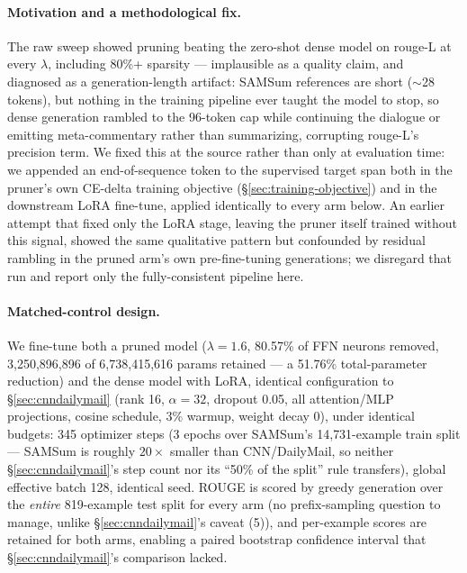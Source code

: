 \documentclass[11pt]{article}
\begin{document}
\paragraph{Motivation and a methodological fix.} The raw sweep showed
pruning beating the zero-shot dense model on rouge-L at every $\lambda$,
including 80\%+ sparsity --- implausible as a quality claim, and diagnosed as
a generation-length artifact: SAMSum references are short ($\sim$28 tokens),
but nothing in the training pipeline ever taught the model to stop, so
dense generation rambled to the 96-token cap while continuing the dialogue
or emitting meta-commentary rather than summarizing, corrupting rouge-L's
precision term. We fixed this at the source rather than only at
evaluation time: we appended an end-of-sequence token to the supervised
target span both in the pruner's own CE-delta training objective
(\S\ref{sec:training-objective}) and in the downstream LoRA fine-tune, applied identically to
every arm below. An earlier attempt that fixed only the LoRA stage, leaving
the pruner itself trained without this signal, showed the same qualitative
pattern but confounded by residual rambling in the pruned arm's own
pre-fine-tuning generations; we disregard that run and report only the
fully-consistent pipeline here.

\paragraph{Matched-control design.} We fine-tune both a pruned model
($\lambda=1.6$, 80.57\% of FFN neurons removed, 3{,}250{,}896{,}896 of
6{,}738{,}415{,}616 params retained --- a 51.76\% total-parameter reduction)
and the dense model with LoRA, identical configuration to
\S\ref{sec:cnndailymail} (rank 16, $\alpha=32$, dropout 0.05, all
attention/MLP projections, cosine schedule, 3\% warmup, weight decay 0),
under identical budgets: 345 optimizer steps (3 epochs over SAMSum's
14{,}731-example train split --- SAMSum is roughly $20\times$ smaller than
CNN/DailyMail, so neither \S\ref{sec:cnndailymail}'s step count nor its
``50\% of the split'' rule transfers), global effective batch 128, identical
seed. ROUGE is scored by greedy generation over the \emph{entire}
819-example test split for every arm (no prefix-sampling question to manage,
unlike \S\ref{sec:cnndailymail}'s caveat (5)), and per-example scores are
retained for both arms, enabling a paired bootstrap confidence interval that
\S\ref{sec:cnndailymail}'s comparison lacked.
\end{document}
